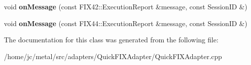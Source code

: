 \begin{DoxyCompactItemize}
\item 
\hypertarget{classMyApplication_a5de41645f3dd60993d6580524090637c}{}void {\bfseries on\+Message} (const F\+I\+X42\+::\+Execution\+Report \&message, const Session\+I\+D \&)\label{classMyApplication_a5de41645f3dd60993d6580524090637c}

\item 
\hypertarget{classMyApplication_adb940aaad1e61da009eeb9fa2b11e2bc}{}void {\bfseries on\+Message} (const F\+I\+X44\+::\+Execution\+Report \&message, const Session\+I\+D \&)\label{classMyApplication_adb940aaad1e61da009eeb9fa2b11e2bc}

\end{DoxyCompactItemize}


The documentation for this class was generated from the following file\+:\begin{DoxyCompactItemize}
\item 
/home/jc/metal/src/adapters/\+Quick\+F\+I\+X\+Adapter/Quick\+F\+I\+X\+Adapter.\+cpp\end{DoxyCompactItemize}
